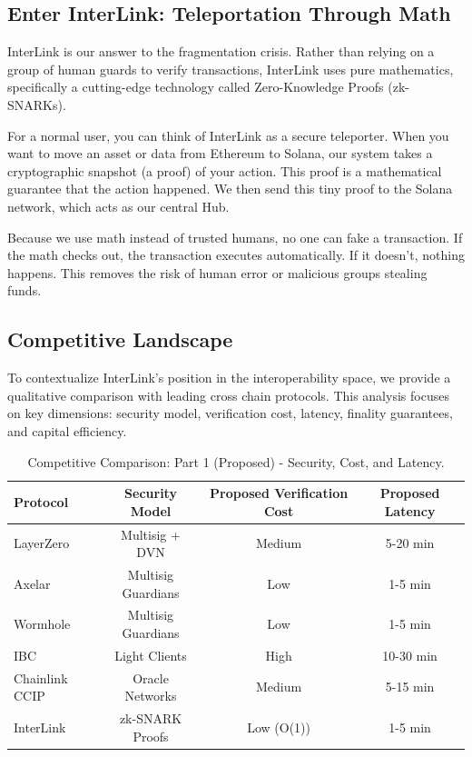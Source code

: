 \documentclass[11pt,a4paper]{article}
\begin{document}
\subsection{Enter InterLink: Teleportation Through Math}
InterLink is our answer to the fragmentation crisis. Rather than relying on a group of human guards to verify transactions, InterLink uses pure mathematics, specifically a cutting-edge technology called Zero-Knowledge Proofs (zk-SNARKs). 

For a normal user, you can think of InterLink as a secure teleporter. When you want to move an asset or data from Ethereum to Solana, our system takes a cryptographic snapshot (a proof) of your action. This proof is a mathematical guarantee that the action happened. We then send this tiny proof to the Solana network, which acts as our central Hub. 

Because we use math instead of trusted humans, no one can fake a transaction. If the math checks out, the transaction executes automatically. If it doesn't, nothing happens. This removes the risk of human error or malicious groups stealing funds.

\subsection{Competitive Landscape}

To contextualize InterLink's position in the interoperability space, we provide a qualitative comparison with leading cross chain protocols. This analysis focuses on key dimensions: security model, verification cost, latency, finality guarantees, and capital efficiency.

\begin{table}[H]
\centering
\begin{tabular}{@{}lccc@{}}
\toprule
Protocol & Security Model & Proposed Verification Cost & Proposed Latency \\
\midrule
LayerZero & Multisig + DVN & Medium & 5-20 min \\
Axelar & Multisig Guardians & Low & 1-5 min \\
Wormhole & Multisig Guardians & Low & 1-5 min \\
IBC & Light Clients & High & 10-30 min \\
Chainlink CCIP & Oracle Networks & Medium & 5-15 min \\
InterLink & zk-SNARK Proofs & Low (O(1)) & 1-5 min \\
\bottomrule
\end{tabular}
\caption{Competitive Comparison: Part 1 (Proposed) - Security, Cost, and Latency.}
\end{table}
\end{document}
